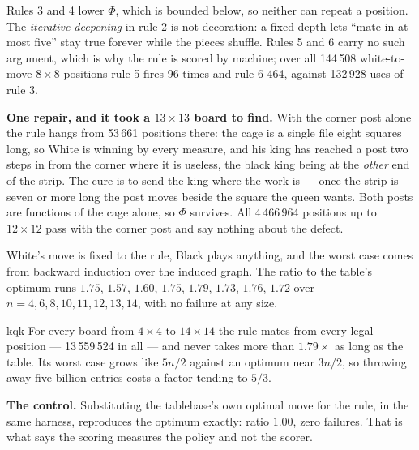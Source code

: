 \documentclass[10pt]{article}
\begin{document}
\noindent
Rules 3 and 4 lower $\Phi$, which is bounded below, so neither can repeat a
position. The \emph{iterative deepening} in rule 2 is not decoration: a fixed
depth lets ``mate in at most five'' stay true forever while the pieces shuffle.
Rules 5 and 6 carry no such argument, which is why the rule is scored by
machine; over all 144\,508 white-to-move $8\times8$ positions rule 5 fires 96
times and rule 6 464, against 132\,928 uses of rule 3.

\medskip
\noindent
\textbf{One repair, and it took a $13\times13$ board to find.} With the corner
post alone the rule hangs from 53\,661 positions there: the cage is a single
file eight squares long, so White is winning by every measure, and his king has
reached a post two steps in from the corner where it is useless, the black king
being at the \emph{other} end of the strip. The cure is to send the king where
the work is --- once the strip is seven or more long the post moves beside the
square the queen wants. Both posts are functions of the cage alone, so $\Phi$
survives. All 4\,466\,964 positions up to $12\times12$ pass with the corner
post and say nothing about the defect.

\medskip
\noindent
White's move is fixed to the rule, Black plays anything, and the worst case
comes from backward induction over the induced graph. The ratio to the table's
optimum runs $1.75$, $1.57$, $1.60$, $1.75$, $\mathbf{1.79}$, $1.73$, $1.76$,
$1.72$ over $n=4,6,8,10,11,12,13,14$, with no failure at any size.

\begin{result}[title={A rule that mates from everywhere, at most $1.79\times$ the optimum}]{kqk}
For every board from $4\times4$ to $14\times14$ the rule mates from every legal
position --- 13\,559\,524 in all --- and never takes more than $1.79\times$ as
long as the table. Its worst case grows like $5n/2$ against an optimum near
$3n/2$, so throwing away five billion entries costs a factor tending to $5/3$.

\medskip
\textbf{The control.} Substituting the tablebase's own optimal move for the
rule, in the same harness, reproduces the optimum exactly: ratio $1.00$, zero
failures. That is what says the scoring measures the policy and not the scorer.
\end{result}
\end{document}
